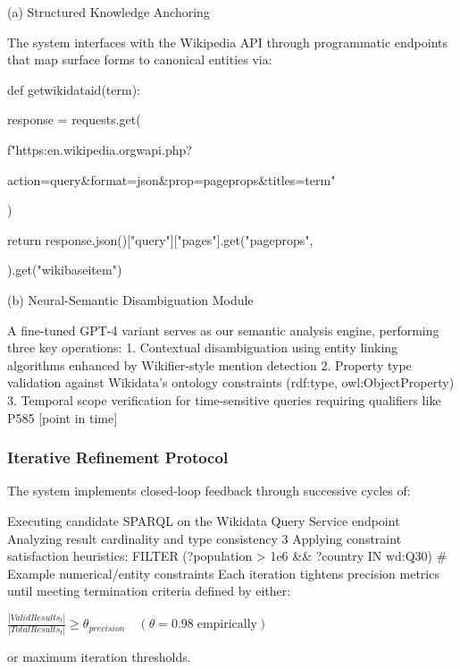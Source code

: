(a) Structured Knowledge Anchoring

The system interfaces with the Wikipedia API through programmatic endpoints that map surface forms to canonical entities via:
\begin{mdframed}
def getwikidataid(term):

response = requests.get(

f"https:\/\/en.wikipedia.org\/w\/api.php?

action=query\&format=json\&prop=pageprops\&titles={term}"
        
    )
    
 return response.json()["query"]["pages"].get("pageprops",
    
    {}).get("wikibaseitem")
\end{mdframed}    
(b) Neural-Semantic Disambiguation Module

A fine-tuned GPT-4 variant serves as our semantic analysis engine, performing three key operations: 
1. Contextual disambiguation using entity linking algorithms enhanced by Wikifier-style mention detection 
2. Property type validation against Wikidata's ontology constraints (rdf:type, owl:ObjectProperty) 
3. Temporal scope verification for time-sensitive queries requiring qualifiers like P585 [point in time]

\subsubsection{Iterative Refinement Protocol} The system implements closed-loop feedback through successive cycles of:

Executing candidate SPARQL on the Wikidata Query Service endpoint
Analyzing result cardinality and type consistency 3 Applying constraint satisfaction heuristics:
FILTER (?population > 1e6 \&\& ?country IN wd:Q30) \# Example numerical/entity constraints 
Each iteration tightens precision metrics until meeting termination criteria defined by either:

$\frac{|ValidResults_t|}{|TotalResults_t|} \geq \theta_{precision} \quad (\theta = 0.
98\;\text{empirically})$

or maximum iteration thresholds.

